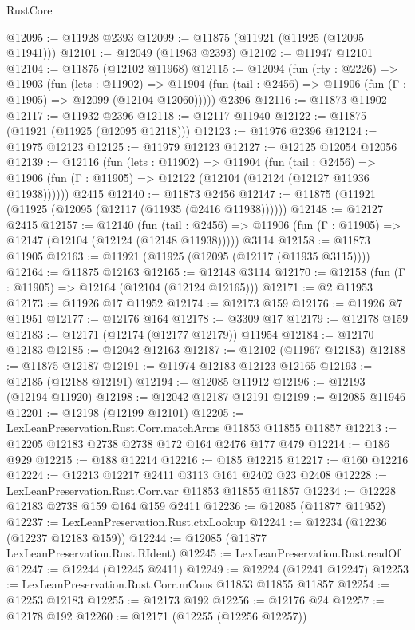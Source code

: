 \begin{lexlean}{RustCore}
\begin{coremodule}
@12095 := @11928 @2393
@12099 := @11875 (@11921 (@11925 (@12095 @11941)))
@12101 := @12049 (@11963 @2393)
@12102 := @11947 @12101
@12104 := @11875 (@12102 @11968)
@12115 := @12094
    (fun (rty : @2226) =>
    @11903
      (fun (lets : @11902) =>
      @11904 (fun (tail : @2456) => @11906 (fun (Γ : @11905) => @12099 (@12104 @12060)))))
    @2396
@12116 := @11873 @11902
@12117 := @11932 @2396
@12118 := @12117 @11940
@12122 := @11875 (@11921 (@11925 (@12095 @12118)))
@12123 := @11976 @2396
@12124 := @11975 @12123
@12125 := @11979 @12123
@12127 := @12125 @12054 @12056
@12139 := @12116
    (fun (lets : @11902) =>
    @11904
      (fun (tail : @2456) =>
      @11906 (fun (Γ : @11905) => @12122 (@12104 (@12124 (@12127 @11936 @11938))))))
    @2415
@12140 := @11873 @2456
@12147 := @11875 (@11921 (@11925 (@12095 (@12117 (@11935 (@2416 @11938))))))
@12148 := @12127 @2415
@12157 := @12140
    (fun (tail : @2456) => @11906 (fun (Γ : @11905) => @12147 (@12104 (@12124 (@12148 @11938)))))
    @3114
@12158 := @11873 @11905
@12163 := @11921 (@11925 (@12095 (@12117 (@11935 @3115))))
@12164 := @11875 @12163
@12165 := @12148 @3114
@12170 := @12158 (fun (Γ : @11905) => @12164 (@12104 (@12124 @12165)))
@12171 := @2 @11953
@12173 := @11926 @17 @11952
@12174 := @12173 @159
@12176 := @11926 @7 @11951
@12177 := @12176 @164
@12178 := @3309 @17
@12179 := @12178 @159
@12183 := @12171 (@12174 (@12177 @12179)) @11954
@12184 := @12170 @12183
@12185 := @12042 @12163
@12187 := @12102 (@11967 @12183)
@12188 := @11875 @12187
@12191 := @11974 @12183 @12123 @12165
@12193 := @12185 (@12188 @12191)
@12194 := @12085 @11912
@12196 := @12193 (@12194 @11920)
@12198 := @12042 @12187 @12191
@12199 := @12085 @11946
@12201 := @12198 (@12199 @12101)
@12205 := LexLeanPreservation.Rust.Corr.matchArms @11853 @11855 @11857
@12213 := @12205 @12183 @2738 @2738 @172 @164 @2476 @177 @479
@12214 := @186 @929
@12215 := @188 @12214
@12216 := @185 @12215
@12217 := @160 @12216
@12224 := @12213 @12217 @2411 @3113 @161 @2402 @23 @2408
@12228 := LexLeanPreservation.Rust.Corr.var @11853 @11855 @11857
@12234 := @12228 @12183 @2738 @159 @164 @159 @2411
@12236 := @12085 (@11877 @11952)
@12237 := LexLeanPreservation.Rust.ctxLookup
@12241 := @12234 (@12236 (@12237 @12183 @159))
@12244 := @12085 (@11877 LexLeanPreservation.Rust.RIdent)
@12245 := LexLeanPreservation.Rust.readOf
@12247 := @12244 (@12245 @2411)
@12249 := @12224 (@12241 @12247)
@12253 := LexLeanPreservation.Rust.Corr.mCons @11853 @11855 @11857
@12254 := @12253 @12183
@12255 := @12173 @192
@12256 := @12176 @24
@12257 := @12178 @192
@12260 := @12171 (@12255 (@12256 @12257))

\end{coremodule}
\end{lexlean}
